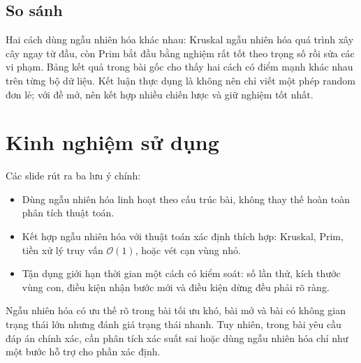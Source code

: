 \documentclass[11pt]{article}
\newcommand{\Oh}{\mathcal{O}}
\begin{document}
\subsection{So sánh}

Hai cách dùng ngẫu nhiên hóa khác nhau: Kruskal ngẫu nhiên hóa quá trình xây
cây ngay từ đầu, còn Prim bắt đầu bằng nghiệm rất tốt theo trọng số rồi sửa
các vi phạm. Bảng kết quả trong bài gốc cho thấy hai cách có điểm mạnh khác
nhau trên từng bộ dữ liệu. Kết luận thực dụng là không nên chỉ viết một phép
random đơn lẻ; với đề mở, nên kết hợp nhiều chiến lược và giữ nghiệm tốt nhất.

\section{Kinh nghiệm sử dụng}

Các slide rút ra ba lưu ý chính:
\begin{itemize}
  \item Dùng ngẫu nhiên hóa linh hoạt theo cấu trúc bài, không thay thế hoàn
  toàn phân tích thuật toán.
  \item Kết hợp ngẫu nhiên hóa với thuật toán xác định thích hợp: Kruskal,
  Prim, tiền xử lý truy vấn \(\Oh(1)\), hoặc vét cạn vùng nhỏ.
  \item Tận dụng giới hạn thời gian một cách có kiểm soát: số lần thử, kích
  thước vùng con, điều kiện nhận bước mới và điều kiện dừng đều phải rõ ràng.
\end{itemize}

Ngẫu nhiên hóa có ưu thế rõ trong bài tối ưu khó, bài mở và bài có không gian
trạng thái lớn nhưng đánh giá trạng thái nhanh. Tuy nhiên, trong bài yêu cầu
đáp án chính xác, cần phân tích xác suất sai hoặc dùng ngẫu nhiên hóa chỉ như
một bước hỗ trợ cho phần xác định.
\end{document}
